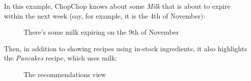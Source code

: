 	\pagebreak
	In this example, ChopChop knows about some \emph{Milk} that is about to expire within the next week (say, for example, it
	is the 4th of November):

	\begin{figure}[!htbp]\centering\ContinuedFloat*
		\caption{There's some milk expiring on the 9th of November}
	\end{figure}

	Then, in addition to showing recipes using in-stock ingredients, it also highlights the \emph{Pancakes} recipe,
	which uses milk:

	\begin{figure}[!htbp]\centering\ContinuedFloat
		\caption{The recommendations view}
	\end{figure}

